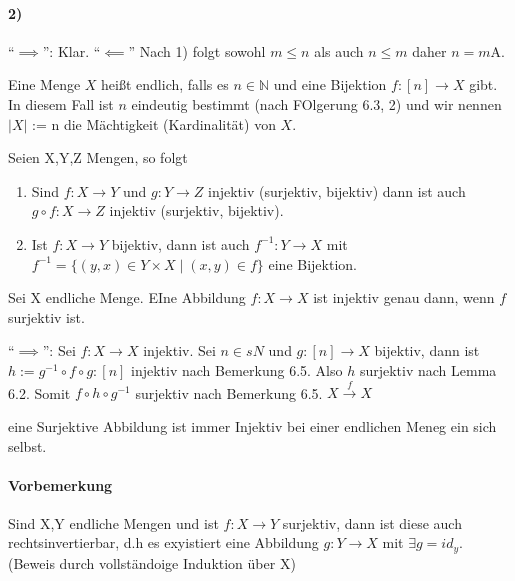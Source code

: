 \documentclass{../../meta/tudscript}
\begin{document}
\paragraph{2)}

``\(\implies\)'': Klar. ``\(\impliedby\)'' Nach 1) folgt sowohl
\(m \leq n\) als auch \(n \leq m\) daher \(n = m\)A.



Eine Menge \(X\) heißt endlich, falls es \(n \in \mathbb{N}\) und eine
Bijektion \(f:[n] \rightarrow X\) gibt. In diesem Fall ist \(n\)
eindeutig bestimmt (nach FOlgerung 6.3, 2) und wir nennen \(|X|\) := n
die Mächtigkeit (Kardinalität) von \(X\).



Seien X,Y,Z Mengen, so folgt

\begin{enumerate}
\def\labelenumi{\arabic{enumi})}
\item
  Sind \(f: X \rightarrow Y\) und \(g: Y \rightarrow Z\) injektiv
  (surjektiv, bijektiv) dann ist auch \(g \circ f: X \rightarrow Z\)
  injektiv (surjektiv, bijektiv).
\item
  Ist \(f: X \rightarrow Y\) bijektiv, dann ist auch
  \(f^{-1}: Y \rightarrow X\) mit
  \(f^{-1} = \{(y,x) \in Y \times X \mid (x,y) \in f\}\) eine Bijektion.
\end{enumerate}



Sei X endliche Menge. EIne Abbildung \(f: X \rightarrow X\) ist injektiv
genau dann, wenn \(f\) surjektiv ist.



``\(\implies\)'': Sei \(f: X \rightarrow X\) injektiv. Sei \(n \in sN\)
und \(g: [n] \rightarrow X\) bijektiv, dann ist
\(h:= g^{-1} \circ f \circ g: [n]\) injektiv nach Bemerkung 6.5. Also
\(h\) surjektiv nach Lemma 6.2. Somit \(f \circ h \circ g^{-1}\)
surjektiv nach Bemerkung 6.5. \(X \xrightarrow{f} X\)



eine Surjektive Abbildung ist immer Injektiv bei einer endlichen Meneg
ein sich selbst.


\paragraph{Vorbemerkung}

Sind X,Y endliche Mengen und ist \(f: X \rightarrow Y\) surjektiv, dann
ist diese auch rechtsinvertierbar, d.h es exyistiert eine Abbildung
\(g: Y \rightarrow X\) mit \(\exists g = id_y\). (Beweis durch
vollständoige Induktion über \textbar{}X\textbar{})
\end{document}
